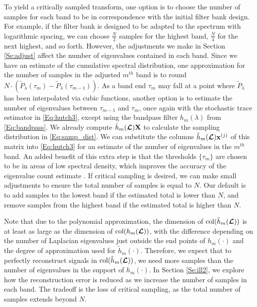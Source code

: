 \documentclass[journal, 10pt]{IEEEtran}
\begin{document}
To yield a critically sampled transform, one option is to choose the number of samples for each band to be in correspondence with the initial filter bank design. For example, if the filter bank is designed to be adapted to the spectrum with logarithmic spacing, we can choose $\frac{N}{2}$ samples for the highest band, $\frac{N}{4}$ for the next highest, and so forth. However, the adjustments we make in Section \ref{Se:adjust} affect the number of eigenvalues contained in each band. Since we have an estimate of the cumulative spectral distribution, one approximation for the number of samples in the adjusted $m^{th}$ band is to round $N \cdot (\tilde{P}_{\lambda}(\tau_{m})-\tilde{P}_{\lambda}(\tau_{m-1}))$. As a band end $\tau_m$ may fall at a point where $\tilde{P}_\lambda$ has been interpolated via cubic functions, another option is to estimate the number of eigenvalues between $\tau_{m-1}$ and $\tau_m$, once again with the stochastic trace estimator in \eqref{Eq:hutch3}, except using the bandpass filter $h_m(\lambda)$ from \eqref{Eq:bandpass}. We already compute $\tilde{h}_m(\boldsymbol{\mathcal{L}}){\bf X}$ to calculate the sampling distribution in \eqref{Eq:samp_dist}. We can substitute the columns $\tilde{h}_m(\boldsymbol{\mathcal{L}}){\bf x}^{(j)}$ of this matrix into 
\eqref{Eq:hutch3} for an estimate of the number of eigenvalues in the $m^{th}$ band. An added benefit of this extra step is that the thresholds $\{\tau_m\}$ are chosen to be in areas of low spectral density, which improves the accuracy of the eigenvalue count estimate \cite{di2016efficient}. If critical sampling is desired, we can make small adjustments to ensure the total number of samples is equal to $N$. Our default is to add samples to the lowest band if the estimated total is lower than $N$, and remove samples from the highest band if the estimated total is higher than $N$.

Note that due to the polynomial approximation, the dimension of $\hbox{col}(\tilde{h}_m(\boldsymbol{\mathcal{L}}))$ is at least as large as the dimension of $\hbox{col}({h}_m(\boldsymbol{\mathcal{L}}))$, with the difference depending on the number of Laplacian eigenvalues just outside the end points of $h_m(\cdot)$ and the degree of approximation used for $\tilde{h}_m(\cdot)$. Therefore, we expect that to perfectly reconstruct signals in $\hbox{col}(\tilde{h}_m(\boldsymbol{\mathcal{L}}))$, we need more samples than the number of eigenvalues in the support of $h_m(\cdot)$. In Section \ref{Se:ill2}, we explore how the reconstruction error is reduced as we increase the number of samples in each band. The tradeoff is the loss of critical sampling, as the total number of samples extends beyond $N$. 
\end{document}
